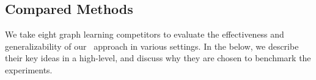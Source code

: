 
\subsection{Compared Methods} %
\label{sec:protocol}
%
\par\smallskip\noindent
%
We take eight graph learning competitors to evaluate the effectiveness and generalizability of our \alg\ approach in various settings.
In the below, we describe their key ideas in a high-level, and discuss why they are chosen to benchmark the experiments.

